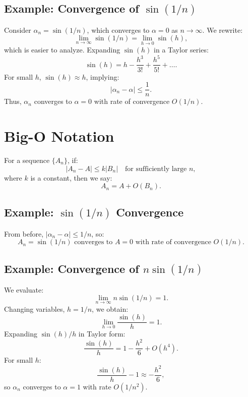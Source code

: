 \documentclass[12pt]{article}
\begin{document}
\subsection{Example: Convergence of $\sin(1/n)$}

Consider $\alpha_n = \sin(1/n)$, which converges to $\alpha = 0$ as $n \to \infty$.
We rewrite:
\begin{equation*}
    \lim_{n \to \infty} \sin(1/n) = \lim_{h \to 0} \sin(h),
\end{equation*}
which is easier to analyze. Expanding $\sin(h)$ in a Taylor series:
\begin{equation*}
    \sin(h) = h - \frac{h^3}{3!} + \frac{h^5}{5!} + \dots.
\end{equation*}
For small $h$, $\sin(h) \approx h$, implying:
\begin{equation*}
    |\alpha_n - \alpha| \leq \frac{1}{n}.
\end{equation*}
Thus, $\alpha_n$ converges to $\alpha = 0$ with rate of convergence $O(1/n)$.

\section{Big-O Notation}

For a sequence $\{A_n\}$, if:
\begin{equation*}
    |A_n - A| \leq k |B_n| \quad \text{for sufficiently large } n,
\end{equation*}
where $k$ is a constant, then we say:
\begin{equation*}
    A_n = A + O(B_n).
\end{equation*}

\subsection{Example: $\sin(1/n)$ Convergence}

From before, $|\alpha_n - \alpha| \leq 1/n$, so:
\begin{equation*}
    A_n = \sin(1/n) \text{ converges to } A = 0 
    \text{ with rate of convergence } O(1/n).
\end{equation*}

\subsection{Example: Convergence of $n \sin(1/n)$}

We evaluate:
\begin{equation*}
    \lim_{n \to \infty} n \sin(1/n) = 1.
\end{equation*}
Changing variables, $h = 1/n$, we obtain:
\begin{equation*}
    \lim_{h \to 0} \frac{\sin(h)}{h} = 1.
\end{equation*}
Expanding $\sin(h)/h$ in Taylor form:
\begin{equation*}
    \frac{\sin(h)}{h} = 1 - \frac{h^2}{6} + O(h^4).
\end{equation*}
For small $h$:
\begin{equation*}
    \frac{\sin(h)}{h} - 1 \approx -\frac{h^2}{6},
\end{equation*}
so $\alpha_n$ converges to $\alpha = 1$ with rate $O(1/n^2)$.
\end{document}
